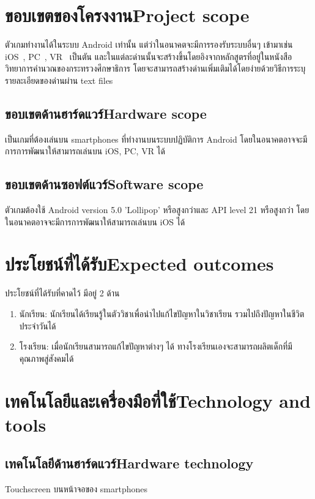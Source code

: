 \section{\ifcpe ขอบเขตของโครงงาน\else Project scope\fi}
ตัวเกมทำงานได้ในระบบ Android เท่านั้น แต่ว่าในอนาคตจะมีการรองรับระบบอื่นๆ 
เข้ามาเช่น iOS~\cite{wios}, PC~\cite{wpc}, VR~\cite{wvr} เป็นตัน 
และในแต่ละด่านนั้นจะสร้างขึ้นโดยอิงจากหลักสูตรที่อยู่ในหนังสือวิทยาการคำนวณของกระทรวงศึกษาธิการ
โดยจะสามารถสร้างด่านเพิ่มเติมได้โดยง่ายด้วยวิธีการระบุรายละเอียดของด่านผ่าน \newline text files

\subsection{\ifcpe ขอบเขตด้านฮาร์ดแวร์\else Hardware scope\fi}
เป็นเกมที่ต้องเล่นบน smartphones ที่ทำงานบนระบบปฏิบัติการ Android โดยในอนาคตอาจจะมีการการพัฒนาให้สามารถเล่นบน iOS, PC, VR ได้

\subsection{\ifcpe ขอบเขตด้านซอฟต์แวร์\else Software scope\fi}
ตัวเกมต้องใช้ Android version 5.0 'Lollipop' หรือสูงกว่าและ API level 21 หรือสูงกว่า
โดยในอนาคตอาจจะมีการการพัฒนาให้สามารถเล่นบน iOS ได้

\section{\ifcpe ประโยชน์ที่ได้รับ\else Expected outcomes\fi}
ประโยชน์ที่ได้รับที่คาดไว้ มีอยู่ 2 ด้าน 
\begin{enumerate}
    \item นักเรียน: นักเรียนได้เรียนรู้ในตัววิชาเพื่อนำไปแก้ไขปัญหาในวิชาเรียน รวมไปถึงปัญหาในชีวิตประจำวันได้
    \item โรงเรียน: เมื่อนักเรียนสามารถแก้ไขปัญหาต่างๆ ได้ ทางโรงเรียนเองจะสามารถผลิตเด็กที่มีคุณภาพสู่สังคมได้ 
\end{enumerate}

\section{\ifcpe เทคโนโลยีและเครื่องมือที่ใช้\else Technology and tools\fi}

\subsection{\ifcpe เทคโนโลยีด้านฮาร์ดแวร์\else Hardware technology\fi}
Touchscreen บนหน้าจอของ smartphones

